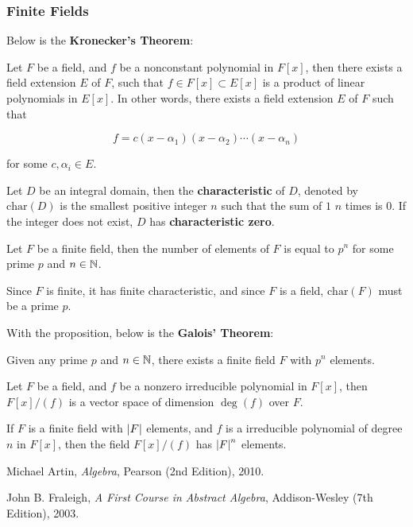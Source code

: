 \documentclass[a4paper,12pt]{article}
\begin{document}
\subsubsection{Finite Fields}
Below is the \textbf{Kronecker's Theorem}:\n

\begin{thm}
  Let $F$ be a field, and $f$ be a nonconstant polynomial in $F[x]$, then there exists a field extension $E$ of $F$, such that $f\in F[x]\subset E[x]$ is a product of linear polynomials in $E[x]$. In other words, there exists a field extension $E$ of $F$ such that
  
  $$f=c(x-\alpha_{1})(x-\alpha_{2})\cdots(x-\alpha_{n})$$\s

  for some $c,\alpha_{i}\in E$.
\end{thm}\n

\begin{dft}
  Let $D$ be an integral domain, then the \textbf{characteristic} of $D$, denoted by $\mathrm{char}(D)$ is the smallest positive integer $n$ such that
  the sum of $1$ $n$ times is $0$. If the integer does not exist, $D$ has \textbf{characteristic zero}.
\end{dft}\n

\begin{pst}
  Let $F$ be a finite field, then the number of elements of $F$ is equal to $p^{n}$ for some prime $p$ and $n\in\mathbb{N}$.\n

  \prf Since $F$ is finite, it has finite characteristic, and since $F$ is a field, $\mathrm{char}(F)$ must be a prime $p$.
\end{pst}\n

With the proposition, below is the \textbf{Galois' Theorem}:\n

\begin{thm}
  Given any prime $p$ and $n\in\mathbb{N}$, there exists a finite field $F$ with $p^{n}$ elements.
\end{thm}\n

\begin{pst}
  Let $F$ be a field, and $f$ be a nonzero irreducible polynomial in $F[x]$, then $F[x]/(f)$ is a vector space of dimension $\deg(f)$ over $F$.
\end{pst}\n

\begin{crl}
  If $F$ is a finite field with $\left| F\right|$ elements, and $f$ is a irreducible polynomial of degree $n$ in $F[x]$, then the field $F[x]/(f)$ has $\left| F\right|^{n}$ elements.
\end{crl}



\begin{reflist}
  \item Michael Artin, \textit{Algebra}, Pearson (2nd Edition), 2010.
  \item John B. Fraleigh, \textit{A First Course in Abstract Algebra}, Addison-Wesley (7th Edition), 2003.
\end{reflist}
\end{document}
